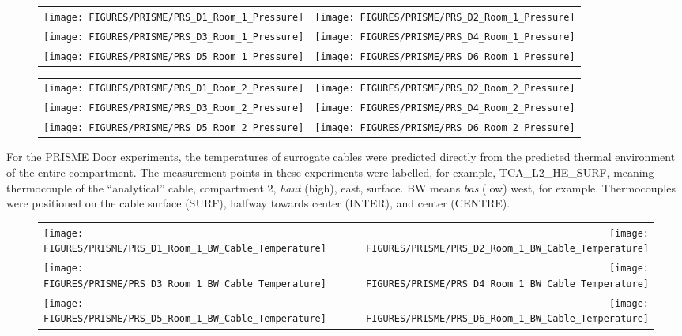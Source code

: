 \begin{figure}[!ht]
\begin{tabular*}{\textwidth}{l@{\extracolsep{\fill}}r}
\texttt{[image: FIGURES/PRISME/PRS\_D1\_Room\_1\_Pressure]} &
\texttt{[image: FIGURES/PRISME/PRS\_D2\_Room\_1\_Pressure]} \\
\texttt{[image: FIGURES/PRISME/PRS\_D3\_Room\_1\_Pressure]} &
\texttt{[image: FIGURES/PRISME/PRS\_D4\_Room\_1\_Pressure]} \\
\texttt{[image: FIGURES/PRISME/PRS\_D5\_Room\_1\_Pressure]} &
\texttt{[image: FIGURES/PRISME/PRS\_D6\_Room\_1\_Pressure]}
\end{tabular*}
\label{PRISME_Room_1_Pressures}
\end{figure}

\begin{figure}[p]
\begin{tabular*}{\textwidth}{l@{\extracolsep{\fill}}r}
\texttt{[image: FIGURES/PRISME/PRS\_D1\_Room\_2\_Pressure]} &
\texttt{[image: FIGURES/PRISME/PRS\_D2\_Room\_2\_Pressure]} \\
\texttt{[image: FIGURES/PRISME/PRS\_D3\_Room\_2\_Pressure]} &
\texttt{[image: FIGURES/PRISME/PRS\_D4\_Room\_2\_Pressure]} \\
\texttt{[image: FIGURES/PRISME/PRS\_D5\_Room\_2\_Pressure]} &
\texttt{[image: FIGURES/PRISME/PRS\_D6\_Room\_2\_Pressure]}
\end{tabular*}
\label{PRISME_Room_2_Pressures}
\end{figure}

\clearpage

For the PRISME Door experiments, the temperatures of surrogate cables were predicted directly from the predicted thermal environment of the entire compartment. The measurement points in these experiments were labelled, for example, TCA\_L2\_HE\_SURF, meaning thermocouple of the ``analytical'' cable, compartment 2, {\it haut} (high), east, surface. BW means {\it bas} (low) west, for example. Thermocouples were positioned on the cable surface (SURF), halfway towards center (INTER), and center (CENTRE).

\begin{figure}[p]
\begin{tabular*}{\textwidth}{l@{\extracolsep{\fill}}r}
\texttt{[image: FIGURES/PRISME/PRS\_D1\_Room\_1\_BW\_Cable\_Temperature]} &
\texttt{[image: FIGURES/PRISME/PRS\_D2\_Room\_1\_BW\_Cable\_Temperature]} \\
\texttt{[image: FIGURES/PRISME/PRS\_D3\_Room\_1\_BW\_Cable\_Temperature]} &
\texttt{[image: FIGURES/PRISME/PRS\_D4\_Room\_1\_BW\_Cable\_Temperature]} \\
\texttt{[image: FIGURES/PRISME/PRS\_D5\_Room\_1\_BW\_Cable\_Temperature]} &
\texttt{[image: FIGURES/PRISME/PRS\_D6\_Room\_1\_BW\_Cable\_Temperature]}
\end{tabular*}
\label{PRISME_BW_Cable_Room_1}
\end{figure}

